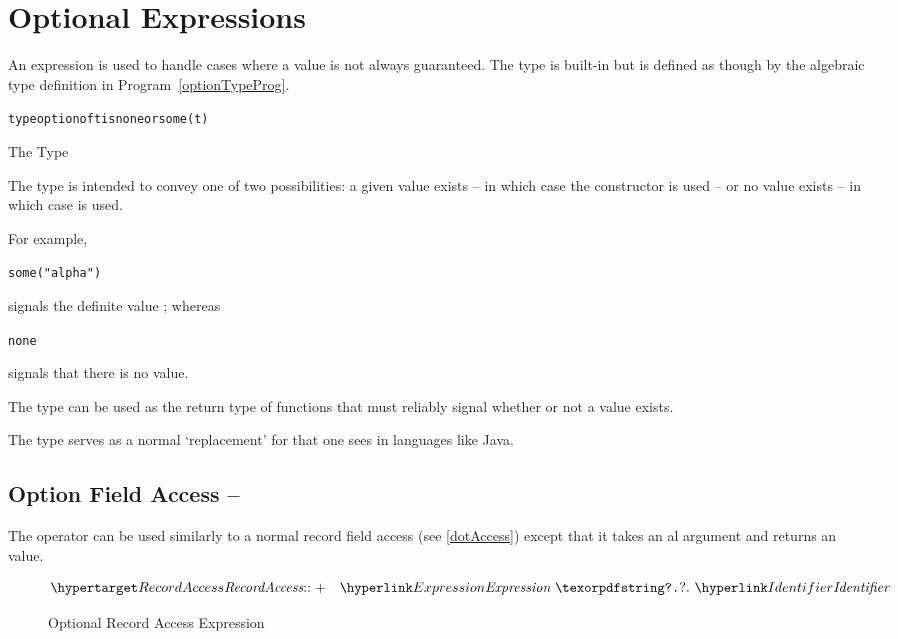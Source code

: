 \section{Optional Expressions}
\label{optionExpression}

An  expression is used to handle cases where a value is not always guaranteed. The  type is built-in but is defined as though by the algebraic type definition in Program~\vref{optionTypeProg}.

\begin{program}
\begin{alltt}
type option of t is none or some(t)
\end{alltt}
\caption{The  Type}
\label{optionTypeProg}
\end{program}

The  type is intended to convey one of two possibilities: a given value exists -- in which case the  constructor is used -- or no value exists -- in which case  is used.

For example,
\begin{alltt}
some("alpha")
\end{alltt}
signals the definite  value ; whereas 
\begin{alltt}
none
\end{alltt}
signals that there is no value.

The  type can be used as the return type of functions that must reliably signal whether or not a value exists.
\begin{aside}
The  type serves as a normal `replacement' for  that one sees in languages like Java.
\end{aside}

\subsection{Option Field Access -- }
\label{optionChaining}

The  operator can be used similarly to a normal record field access (see \vref{dotAccess}) except that it takes an al argument and returns an  value. 

\begin{figure}[htbp]
\begin{eqnarray*}
\ntDef{RecordAccess}&\arrowplus&\ntRef{Expression}\ \q{?.}\ \ntRef{Identifier}
\end{eqnarray*}
\caption{Optional Record Access Expression}\label{optionAccessFig}
\end{figure}

